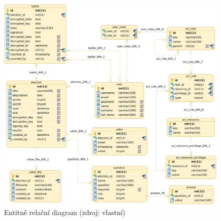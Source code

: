 \begin{figure}[h]
	\centering
	\includegraphics[width=\linewidth]{svg/erd3.png}
	\captionsetup{width=\linewidth}
	\caption[Entitně relační diagram]{Entitně relační diagram (zdroj: vlastní)}
	\label{fig:ERD}
\end{figure}


\clearpage